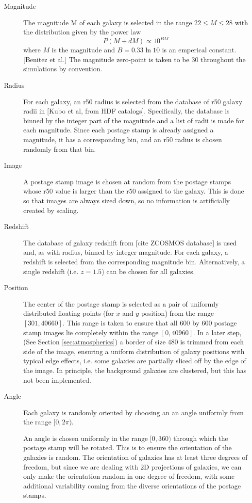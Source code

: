 \documentclass[10pt,twoside]{article}
\theoremstyle{definition}
\theoremstyle{exercise}
\begin{document}
\begin{description}
  \item[Magnitude] The magnitude M of each galaxy is selected in the range $22 \le M \le 28$ with the distribution given by the power law
    \begin{equation}
      P(M+dM) \propto 10^{BM}
      \label{eq:mag_power_law}
    \end{equation}
    where $M$ is the magnitude and $B = 0.33\ln 10$ is an emperical constant.[Benitez et al.] The magnitude zero-point is taken to be 30 throughout the simulations by convention.

  \item[Radius] 
For each galaxy, an r50 radius is selected from the database of r50 galaxy radii in [Kubo et al, from HDF catalogs]. Specifically, the database is binned by the integer part of the magnitude  and a list of radii is made for each magnitude. Since each postage stamp is already assigned a magnitude, it has a corresponding bin, and an r50 radius is chosen randomly from that bin.

  \item[Image] A postage stamp image is chosen at random from the postage stamps whose r50 value is larger than the r50 assigned to the galaxy. This is done so that images are always sized down, so no information is artificially created by scaling.

  \item[Redshift] The database of galaxy redshift from [cite ZCOSMOS database] is used and, as with radius, binned by integer magnitude. For each galaxy, a redshift is selected from the corresponding magnitude bin. Alternatively, a single redshift (i.e. $z=1.5$) can be chosen for all galaxies.

  \item[Position] The center of the postage stamp is selected as a pair of uniformly distributed floating points (for $x$ and $y$ position) from the range $[301, 40660]$. This range is taken to ensure that all 600 by 600 postage stamp images lie completely within the range $[0,40960]$. In a later step, (See Section \ref{sec:atmospherics}) a border of size $480$ is trimmed from each side of the image, ensuring a uniform distribution of galaxy positions with typical edge effects, i.e. some galaxies are partially sliced off by the edge of the image. In principle, the background galaxies are clustered, but this has not been implemented.

  \item[Angle] 
  Each galaxy is randomly oriented by choosing an an angle uniformly from the range $[0,2\pi)$. 
  
  An angle is chosen uniformly in the range $[0,360)$ through which the postage stamp will be rotated. This is to ensure the orientation of the galaxies is random. The orientation of galaxies has at least three degrees of freedom, but since we are dealing with 2D projections of galaxies, we can only make the orientation random in one degree of freedom, with some additional variability coming from the diverse orientations of the postage stamps. 
\end{description}
\end{document}
